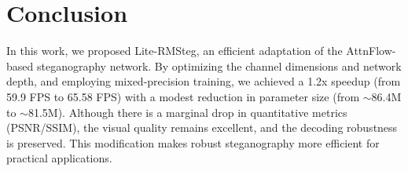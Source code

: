 \documentclass[10pt,twocolumn,letterpaper]{article}
\begin{document}
\begin{table}[h]
\centering
\caption{Robustness against various attacks (TRA \%).}
\label{tab:robustness}
\end{table}

\section{Conclusion}
In this work, we proposed Lite-RMSteg, an efficient adaptation of the AttnFlow-based steganography network. By optimizing the channel dimensions and network depth, and employing mixed-precision training, we achieved a 1.2x speedup (from 59.9 FPS to 65.58 FPS) with a modest reduction in parameter size (from $\sim$86.4M to $\sim$81.5M). Although there is a marginal drop in quantitative metrics (PSNR/SSIM), the visual quality remains excellent, and the decoding robustness is preserved. This modification makes robust steganography more efficient for practical applications.
\end{document}
